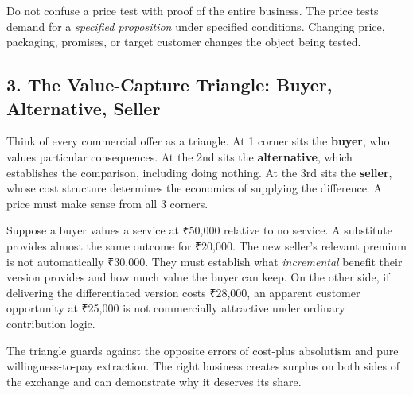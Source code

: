 Do not confuse a price test with proof of the entire business. The price tests demand for a \emph{specified proposition} under specified conditions. Changing price, packaging, promises, or target customer changes the object being tested.

\subsection*{3. The Value-Capture Triangle: Buyer, Alternative, Seller}

Think of every commercial offer as a triangle. At 1 corner sits the \textbf{buyer}, who values particular consequences. At the 2nd sits the \textbf{alternative}, which establishes the comparison, including doing nothing. At the 3rd sits the \textbf{seller}, whose cost structure determines the economics of supplying the difference. A price must make sense from all 3 corners.

Suppose a buyer values a service at ₹50,000 relative to no service. A substitute provides almost the same outcome for ₹20,000. The new seller's relevant premium is not automatically ₹30,000. They must establish what \emph{incremental} benefit their version provides and how much value the buyer can keep. On the other side, if delivering the differentiated version costs ₹28,000, an apparent customer opportunity at ₹25,000 is not commercially attractive under ordinary contribution logic.

The triangle guards against the opposite errors of cost-plus absolutism and pure willingness-to-pay extraction. The right business creates surplus on both sides of the exchange and can demonstrate why it deserves its share.
